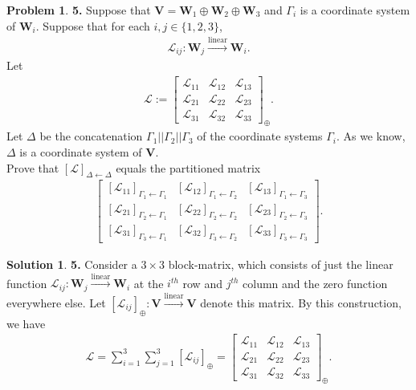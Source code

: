 \documentclass{article}
\theoremstyle{definition}
\newtheorem*{prob*}{Problem}
\newtheorem*{sln*}{Solution}
\newcommand{\V}{\mathbf{V}}
\newcommand{\W}{\mathbf{W}}
\newcommand{\lag}{\mathcal{L}}
\newcommand{\lin}{\overset{\text{linear}}{\longrightarrow}}
\begin{document}
\begin{prob*}\textbf{5.} Suppose that $\V = \W_1 \oplus \W_2 \oplus \W_3$ and $\Gamma_i$ is a coordinate system of $\W_i$. Suppose that for each $i,j \in \{1,2,3 \}$, 
	\begin{align*}
	\lag_{ij} : \W_j \overset{\text{linear}}{\longrightarrow} \W_i.
	\end{align*}
	Let 
	\begin{align*}
	\lag := \begin{bmatrix}
	\lag_{11} & \lag_{12} & \lag_{13}\\
	\lag_{21} & \lag_{22} & \lag_{23}\\
	\lag_{31} & \lag_{32} & \lag_{33}
	\end{bmatrix}_\oplus.
	\end{align*}
	Let $\Delta$ be the concatenation $\Gamma_1 \vert\vert \Gamma_2\vert\vert \Gamma_3$ of the coordinate systems $\Gamma_i$. As we know, $\Delta$ is a coordinate system of $\V$. \\
	
	Prove that $[\lag]_{\Delta \leftarrow \Delta}$ equals the partitioned matrix
	\begin{align*}
	\begin{bmatrix}
	[\lag_{11}]_{\Gamma_1 \leftarrow \Gamma_1} & [\lag_{12}]_{\Gamma_1 \leftarrow \Gamma_2} & [\lag_{13}]_{\Gamma_1 \leftarrow \Gamma_3}\\
	[\lag_{21}]_{\Gamma_2 \leftarrow \Gamma_1} & [\lag_{22}]_{\Gamma_2 \leftarrow \Gamma_2} & [\lag_{23}]_{\Gamma_2 \leftarrow \Gamma_3}\\
	[\lag_{31}]_{\Gamma_3 \leftarrow \Gamma_1} & [\lag_{32}]_{\Gamma_3 \leftarrow \Gamma_2} & [\lag_{33}]_{\Gamma_3 \leftarrow \Gamma_3}
	\end{bmatrix}.
	\end{align*}
	 
	
	\begin{sln*}\textbf{5.} Consider a $3\times 3$ block-matrix, which consists of just the linear function $\lag_{ij} : \W_j \lin \W_i$ at the $i^{th}$ row and $j^{th}$ column and the zero function everywhere else. Let $[\lag_{ij}]_\oplus : \V \lin \V$ denote this matrix. By this construction, we have
		\begin{align*}
		\lag = \sum^3_{i=1}\sum^3_{j=1}[\lag_{ij}]_\oplus = \begin{bmatrix}
		\lag_{11} & \lag_{12} & \lag_{13}\\
		\lag_{21} & \lag_{22} & \lag_{23}\\
		\lag_{31} & \lag_{32} & \lag_{33}
		\end{bmatrix}_\oplus.
		\end{align*}
	

\end{sln*}
\end{prob*}
\end{document}
